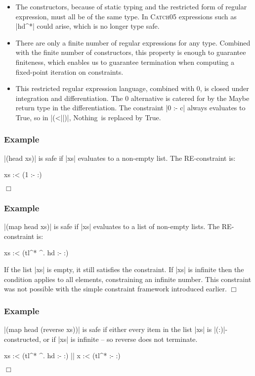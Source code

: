 \documentclass[preprint]{sigplanconf}
\newcommand{\C}[1]{\textsf{#1}}
\newcommand{\catch}{\textsc{Catch}}
\newcounter{exmp}
\newcommand{\yesexample}{\subsubsection*{Example \arabic{exmp}}\addtocounter{exmp}{1}}
\newcommand{\noexample}{\hfill$\Box$}
\newenvironment{example}{\yesexample}{\noexample}
\begin{document}
\begin{itemize}
\item The constructors, because of static typing and the restricted form of regular expression, must all be of the same type. In \catch05 expressions such as |hd^*| could arise, which is no longer type safe.

\item There are only a finite number of regular expressions for any type. Combined with the finite number of constructors, this property is enough to guarantee finiteness, which enables us to guarantee termination when computing a fixed-point iteration on constraints.

\item This restricted regular expression language, combined with 0, is closed under integration and differentiation. The 0 alternative is catered for by the \C{Maybe} return type in the differentiation. The constraint |0 :- c| always evaluates to True, so in |(<||)|, \C{Nothing}\ is replaced by True.
\end{itemize}

\begin{example}
|(head xs)| is safe if |xs| evaluates to a non-empty list. The RE-constraint is:

\begin{code}
xs :< (1 :- {:})
\end{code}
\end{example}

\begin{example}
|(map head xs)| is safe if |xs| evaluates to a list of non-empty lists. The RE-constraint is:

\begin{code}
xs :< (tl^* ^. hd :- {:})
\end{code}

If the list |xs| is empty, it still satisfies the constraint. If |xs| is infinite then the condition applies to all elements, constraining an infinite number. This constraint was not possible with the simple constraint framework introduced earlier.
\end{example}

\begin{example}
|(map head (reverse xs))| is safe if either every item in the list |xs| is |(:)|-constructed, or if |xs| is infinite -- so \C{reverse} does not terminate.

\begin{code}
xs :< (tl^* ^. hd :- {:}) || x :< (tl^* :- {:})
\end{code}
\end{example}
\end{document}
